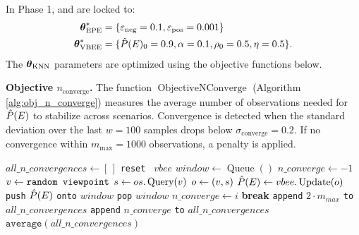 In Phase 1, \vbee{} and \epe{} are locked to:
\begin{align*}
    \boldsymbol{\theta}_{\text{EPE}}^* &= \{\varepsilon_{\text{neg}} = 0.1, \varepsilon_{\text{pos}} = 0.001\}\\
    \boldsymbol{\theta}_{\text{VBEE}}^* &= \{\hat{P}(E)_0 = 0.9, \alpha = 0.1, \rho_0 = 0.5, \eta = 0.5\}.
\end{align*}
The \(\boldsymbol{\theta}_{\text{KNN}}\) parameters are optimized using the objective functions below.

\noindent\textbf{Objective \(n_{\text{converge}}\).} The function \(\operatorname{ObjectiveNConverge}\) (Algorithm \ref{alg:obj_n_converge}) measures the average number of observations needed for \(\hat{P}(E)\) to stabilize across scenarios. Convergence is detected when the standard deviation over the last \(w=100\) samples drops below \(\sigma_{\text{converge}}=0.2\). If no convergence within \(m_{\text{max}}=1000\) observations, a penalty is applied.

\begin{singlespace}
\begin{algorithm}[H]
    \caption[Objective Function: $n_{\text{converge}}$]{ObjectiveNConverge}
    \label{alg:obj_n_converge}
    \begin{algorithmic}[1]
            \State $all\_n\_convergences \gets [\,]$
                \State \texttt{reset } $vbee$ 
                \State $window \gets \operatorname{Queue}()$
                \State $n\_converge \gets -1$
                    \State $v \gets \texttt{random viewpoint}$
                    \State $s \gets os.\operatorname{Query}(v)$
                    \State $o \gets (v,s)$
                    \State $\hat{P}(E) \gets vbee.\operatorname{Update}(o)$
                    \State \texttt{push} $\hat{P}(E)$ \texttt{onto} $window$
                        \State \texttt{pop} $window$
                            \State $n\_converge \gets i$
                            \State \textbf{break}
                        \EndIf
                    \EndIf
                \EndFor
                    \State \texttt{append} $2 \cdot m_{max}$ \texttt{to} $all\_n\_convergences$
                \Else
                    \State \texttt{append} $n\_converge$ \texttt{to} $all\_n\_convergences$
                \EndIf
            \EndFor
            \State \Return $\texttt{average}(all\_n\_convergences)$
        \EndFunction
    \end{algorithmic}
\end{algorithm}
\end{singlespace}

